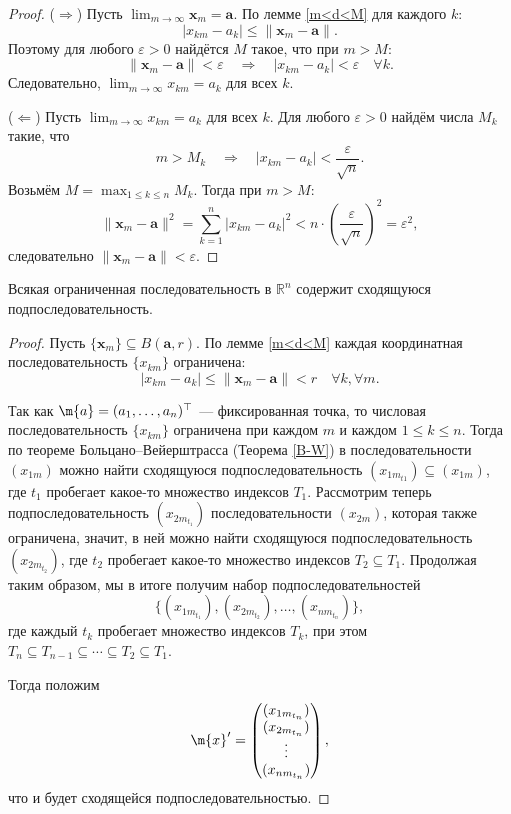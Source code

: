 \begin{proof}
($\Rightarrow$) Пусть $\lim_{m \to \infty} \mathbf{x}_m = \mathbf{a}$. По лемме \ref{m<d<M} для каждого $k$:
\[
|x_{km} - a_k| \leq \|\mathbf{x}_m - \mathbf{a}\|.
\]
Поэтому для любого $\varepsilon > 0$ найдётся $M$ такое, что при $m > M$:
\[
\|\mathbf{x}_m - \mathbf{a}\| < \varepsilon \quad \Rightarrow \quad |x_{km} - a_k| < \varepsilon \quad \forall k.
\]
Следовательно, $\lim_{m \to \infty} x_{km} = a_k$ для всех $k$.

($\Leftarrow$) Пусть $\lim_{m \to \infty} x_{km} = a_k$ для всех $k$. Для любого $\varepsilon > 0$ найдём числа $M_k$ такие, что
\[
m > M_k \quad \Rightarrow \quad |x_{km} - a_k| < \frac{\varepsilon}{\sqrt{n}}.
\]
Возьмём $M = \max_{1 \leq k \leq n} M_k$. Тогда при $m > M$:
\[
\|\mathbf{x}_m - \mathbf{a}\|^2 = \sum_{k=1}^n |x_{km} - a_k|^2 < n \cdot \left(\frac{\varepsilon}{\sqrt{n}}\right)^2 = \varepsilon^2,
\]
следовательно $\|\mathbf{x}_m - \mathbf{a}\| < \varepsilon$.
\end{proof}

\begin{theorem}\label{genB-W}
Всякая ограниченная последовательность в $\mathbb{R}^n$ содержит сходящуюся подпоследовательность.
\end{theorem}
\begin{proof}
Пусть $\{\mathbf{x}_m\} \subseteq B(\mathbf{a}, r)$. По лемме \ref{m<d<M} каждая координатная последовательность $\{x_{km}\}$ ограничена:
\[
|x_{km} - a_k| \leq \|\mathbf{x}_m - \mathbf{a}\| < r \quad \forall k, \forall m.
\]


Так как $\m{a} =(a_1,\ldots, a_n)^\top$ --- фиксированная точка, то числовая последовательность $\{x_{km}\}$ ограничена при каждом $m$ и каждом $1\le k \le n$. Тогда по теореме Больцано--Вейерштрасса (Теорема \ref{B-W}) в последовательности $(x_{1m})$ можно найти сходящуюся подпоследовательность $(x_{1m_{t1}}) \subseteq (x_{1m})$, где $t_1$ пробегает какое-то множество индексов $T_1$. Рассмотрим теперь подпоследовательность $(x_{2m_{t_1}})$ последовательности $(x_{2m})$, которая также ограничена, значит, в ней можно найти сходящуюся подпоследовательность $(x_{2m_{t_2}})$, где $t_2$ пробегает какое-то множество индексов $T_2 \subseteq T_1$. Продолжая таким образом, мы в итоге получим набор подпоследовательностей
\[
 \{(x_{1m_{t_1}}), (x_{2m_{t_2}}), \ldots, (x_{nm_{t_n}})\},
\]
где каждый $t_k$ пробегает множество индексов $T_k$, при этом $T_n \subseteq T_{n-1} \subseteq \cdots \subseteq T_2 \subseteq T_1.$

Тогда положим 
\[
  \m{x}' = \begin{pmatrix}
      (x_{1m_{t_n}}) \\
      (x_{2m_{t_n}}) \\
      \vdots \\
      (x_{nm_{t_n}})
  \end{pmatrix},
\]
что и будет сходящейся подпоследовательностью.    
\end{proof}











